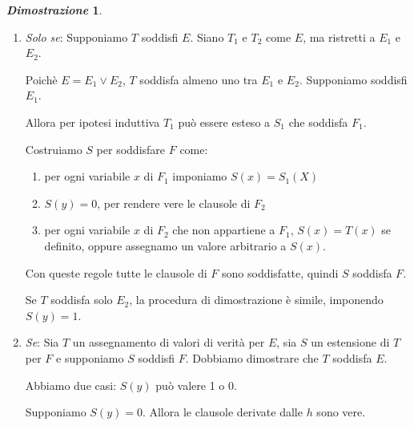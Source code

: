 \documentclass[12pt]{article}
\theoremstyle{definition}
\newtheorem*{myproof}{\em Dimostrazione}
\begin{document}
\begin{myproof}
\begin{description}
\begin{enumerate}
\begin{enumerate}
            \item \textit{Solo se}: Supponiamo \(T\) soddisfi \(E\). Siano \(T_1\) e \(T_2\) come \(E\), ma ristretti a \(E_1\) e \(E_2\).\newline
              
              Poich\`e \(E = E_1 \lor E_2\), \(T\) soddisfa almeno uno tra \(E_1\) e \(E_2\). Supponiamo soddisfi \(E_1\).\newline
              
              Allora per ipotesi induttiva \(T_1\) pu\`o essere esteso a \(S_1\) che soddisfa \(F_1\).\newline
              
              Costruiamo \(S\) per soddisfare \(F\) come:\newline
              
              \begin{enumerate}
                \item per ogni variabile \(x\) di \(F_1\) imponiamo \(S(x) = S_1(X)\)
                \item \(S(y)=0\), per rendere vere le clausole di \(F_2\)
                \item per ogni variabile \(x\) di \(F_2\) che non appartiene a \(F_1\), \(S(x)=T(x)\) se definito, oppure
                  assegnamo un valore arbitrario a \(S(x)\).\newline
              \end{enumerate}

              Con queste regole tutte le clausole di \(F\) sono soddisfatte, quindi \(S\) soddisfa \(F\). \newline

              Se \(T\) soddisfa solo \(E_2\), la procedura di dimostrazione \`e simile, imponendo \(S(y) = 1\).\newline

            \item \textit{Se}: Sia \(T\) un assegnamento di valori di verit\`a per \(E\), sia \(S\) un estensione di \(T\)
              per \(F\) e supponiamo \(S\) soddisfi \(F\). Dobbiamo dimostrare che \(T\) soddisfa \(E\).\newline

              Abbiamo due casi: \(S(y)\) pu\`o valere 1 o 0.\newline

              Supponiamo \(S(y)=0\). Allora le clausole derivate dalle \(h\) sono vere.\newline


\end{enumerate}
\end{enumerate}
\end{description}
\end{myproof}
\end{document}
